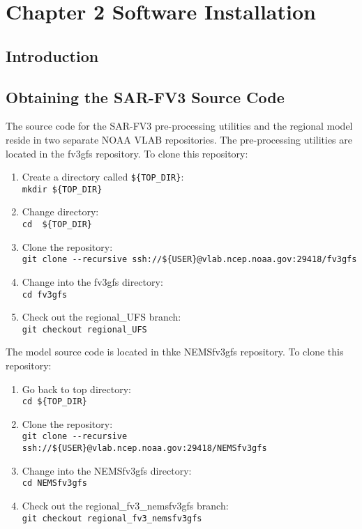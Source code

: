 \chapter{Chapter 2 Software Installation}
 
\section{Introduction}
\section{Obtaining the SAR-FV3 Source Code}
The source code for the SAR-FV3 pre-processing utilities and the regional model reside in two separate 
NOAA VLAB repositories.  The pre-processing utilities are located in the fv3gfs repository.  To clone
this repository:

    \begin{enumerate}
       \item Create a directory called \verb|${TOP_DIR}|: \\
          \verb|mkdir ${TOP_DIR}|
       \item Change directory: \\
          \verb|cd  ${TOP_DIR}|
       \item Clone the repository: \\
          \verb|git clone --recursive ssh://${USER}@vlab.ncep.noaa.gov:29418/fv3gfs|
       \item Change into the fv3gfs directory: \\
          \verb|cd fv3gfs|
       \item Check out the regional\_UFS branch: \\
           \verb|git checkout regional_UFS|
    \end{enumerate}

The model source code is located in thke NEMSfv3gfs repository.  To clone this repository:

    \begin{enumerate}
       \item Go back to top directory: \\
          \verb|cd ${TOP_DIR}|
       \item Clone the repository: \\
          \verb|git clone --recursive ssh://${USER}@vlab.ncep.noaa.gov:29418/NEMSfv3gfs|
       \item Change into the NEMSfv3gfs directory: \\
          \verb|cd NEMSfv3gfs|
       \item Check out the regional\_fv3\_nemsfv3gfs branch: \\
          \verb|git checkout regional_fv3_nemsfv3gfs|
    \end{enumerate}

